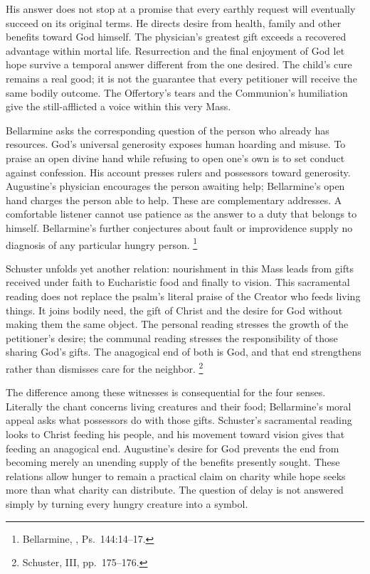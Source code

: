 His answer does not stop at a promise that every earthly request will
eventually succeed on its original terms. He directs desire from
health, family and other benefits toward God himself. The physician's
greatest gift exceeds a recovered advantage within mortal life.
Resurrection and the final enjoyment of God let hope survive a temporal
answer different from the one desired. The child's cure remains a real
good; it is not the guarantee that every petitioner will receive the
same bodily outcome. The Offertory's tears and the Communion's
humiliation give the still-afflicted a voice within this very Mass.

Bellarmine asks the corresponding question of the person who already
has resources. God's universal generosity exposes human hoarding and
misuse. To praise an open divine hand while refusing to open one's own
is to set conduct against confession. His account presses rulers and
possessors toward generosity. Augustine's physician encourages the
person awaiting help; Bellarmine's open hand charges the person able
to help. These are complementary addresses. A comfortable listener
cannot use patience as the answer to a duty that belongs to himself.
Bellarmine's further conjectures about fault or improvidence supply
no diagnosis of any particular hungry person.
\footnote{Bellarmine, , Ps.~144:14--17.}

Schuster unfolds yet another relation: nourishment in this Mass leads
from gifts received under faith to Eucharistic food and finally to
vision. This sacramental reading does not replace the psalm's literal
praise of the Creator who feeds living things. It joins bodily need,
the gift of Christ and the desire for God without making them the
same object. The personal reading stresses the growth of the
petitioner's desire; the communal reading stresses the responsibility
of those sharing God's gifts. The anagogical end of both is God,
and that end strengthens rather than dismisses care for the neighbor.
\footnote{Schuster, III, pp.~175--176.}

The difference among these witnesses is consequential for the four
senses. Literally the chant concerns living creatures and their food;
Bellarmine's moral appeal asks what possessors do with those gifts.
Schuster's sacramental reading looks to Christ feeding his people,
and his movement toward vision gives that feeding an anagogical end.
Augustine's desire for God prevents the end from becoming merely an
unending supply of the benefits presently sought. These relations
allow hunger to remain a practical claim on charity while hope seeks
more than what charity can distribute. The question of delay is not
answered simply by turning every hungry creature into a symbol.


